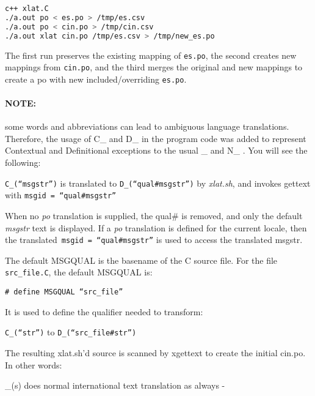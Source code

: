 \begin{lstlisting}[language=bash,numbers=none]
c++ xlat.C
./a.out po < es.po > /tmp/es.csv
./a.out po < cin.po > /tmp/cin.csv
./a.out xlat cin.po /tmp/es.csv > /tmp/new_es.po
\end{lstlisting}

The first run preserves the existing mapping of \texttt{es.po}, the second creates new mappings from \texttt{cin.po}, and the third merges the original and new mappings to create a po with new included/overriding \texttt{es.po}.

\paragraph{NOTE:} some words and abbreviations can lead to ambiguous language translations.  Therefore, the usage of C\_ and D\_ in the program code was added to represent Contextual and Definitional exceptions to the usual \_ and N\_ .  You will see the following:

\vspace{2ex} \texttt{C\_(“msgstr”)}  is translated to \texttt{D\_(“qual\#msgstr”)} by \textit{xlat.sh}, and invokes gettext with \texttt{msgid = “qual\#msgstr”}

\vspace{2ex} When no \textit{po} translation is supplied, the qual\# is removed, and only the default \textit{msgstr} text is displayed.   If a \textit{po} translation is defined for the current locale, then the translated\texttt{ msgid = “qual\#msgstr”} is used to access the translated msgstr.

\vspace{2ex} \noindent The default MSGQUAL is the basename of the C source file.  For the file \texttt{src\_file.C}, the default MSGQUAL is:

\vspace{2ex} \texttt{\# define MSGQUAL “src\_file”}

\vspace{2ex} \noindent It is used to define the qualifier needed to transform:

\vspace{2ex} \texttt{C\_(“str”)} to \texttt{D\_(“src\_file\#str”)}

\vspace{2ex} \noindent The resulting xlat.sh'd source is scanned by xgettext to create the initial cin.po.  In other words:

\vspace{2ex} \_(s) does normal international text translation as always -

